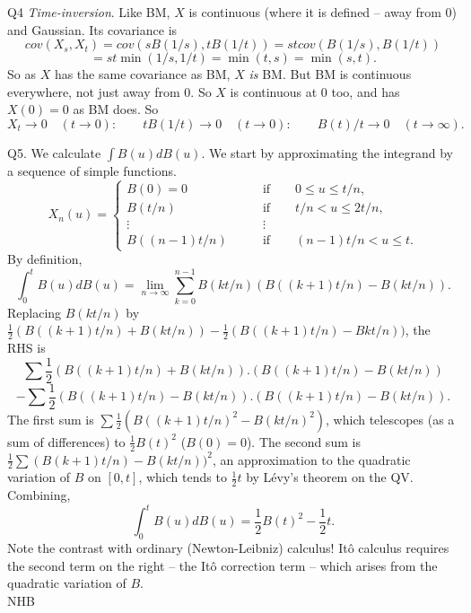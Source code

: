 \documentclass[12pt]{article}
\begin{document}
\ni Q4 {\it Time-inversion}.  Like BM, $X$ is continuous (where it is defined -- away from 0) and Gaussian.  Its covariance is
$$
cov(X_s,X_t) = cov(s B(1/s),t B(1/t)) = st cov(B(1/s),B(1/t))
$$
$$
= st \min(1/s,1/t) = \min(t,s) = \min(s,t).
$$
So as $X$ has the same covariance as BM, $X$ {\it is} BM.  But BM is continuous everywhere, not just away from 0.  So $X$ is continuous at 0 too, and has $X(0) = 0$ as BM does.  So
$$
X_t \to 0 \quad (t \to 0): \qquad t B(1/t) \to 0 \quad (t \to 0): \qquad B(t)/t \to 0 \quad (t \to \infty).
$$

Q5.  We calculate $\int B(u) dB(u)$. We start by
approximating the integrand by a sequence of simple functions.
$$ X_n(u) = \left\{
\begin{array}{ll}
B(0)=0 \qquad &\mbox{if}\qquad 0 \leq u \leq t/n,\\ B(t/n) \qquad
&\mbox{if}\qquad
t/n < u \leq 2t/n,\\ \vdots &\vdots\\
B\!\left((n-1)t/n \right) \qquad &\mbox{if}\qquad (n-1)t/n < u
\leq t.
\end{array}
\right.
$$
By definition,
$$
\int_0^t B(u) dB(u)
= \lim_{n \to \infty} \sum_{k=0}^{n-1} B(kt/n) (B((k+1)t/n)- B(kt/n)).
$$
Replacing $B(kt/n)$ by $\frac{1}{2}(B((k+1)t/n) + B(kt/n)) - \frac{1}{2}(B((k+1)t/n) - Bkt/n))$, the RHS is
$$
\sum \frac{1}{2}(B((k+1)t/n) + B(kt/n)).(B((k+1)t/n)- B(kt/n))
$$
$$
 - \sum \frac{1}{2}(B((k+1)t/n) - B(kt/n)).(B((k+1)t/n)- B(kt/n)).
$$
The first sum is $\sum \frac{1}{2}(B((k+1)t/n)^2 - B(kt/n)^2)$, which telescopes (as a sum of differences) to $\frac{1}{2}B(t)^2$ ($B(0) = 0$).  The second sum is \\
$\frac{1}{2} \sum (B(k+1)t/n) - B(kt/n))^2$, an approximation to the quadratic variation of $B$ on $[0,t]$, which tends to $\frac{1}{2}t$ by L\'evy's theorem on the QV.  Combining,
$$
\int_0^t B(u)dB(u) = \frac{1}{2}B(t)^2 - \frac{1}{2}t.
$$
Note the contrast with ordinary (Newton-Leibniz) calculus! It\^{o}
calculus requires the second term on the right -- the It\^{o}
correction term -- which arises from the quadratic variation of
$B$. \\


\hfil NHB \break
\end{document}
